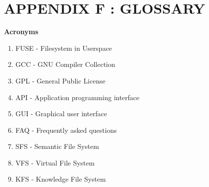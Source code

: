 \section*{APPENDIX F : GLOSSARY}

\noindent \textbf{Acronyms} 
\begin{enumerate}
\item FUSE - Filesystem in Userspace
\item GCC  - GNU Compiler Collection
\item GPL  - General Public License
\item API  - Application programming interface
\item GUI  - Graphical user interface
\item FAQ  - Frequently asked questions 
\item SFS  - Semantic File System
\item VFS  - Virtual File System
\item KFS  - Knowledge File System
\\
\end{enumerate}



